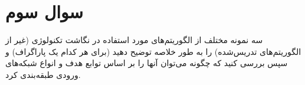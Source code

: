 \section{سوال سوم}

سه نمونه مختلف از الگوریتم‌های مورد استفاده در نگاشت تکنولوژی  (غیر از الگوریتم‌های تدریس‌شده) را به طور خلاصه توضیح دهید (برای هر کدام یک پاراگراف) و سپس بررسی کنید که چگونه می‌توان آنها را بر اساس توابع هدف و انواع شبکه‌های ورودی طبقه‌بندی کرد.